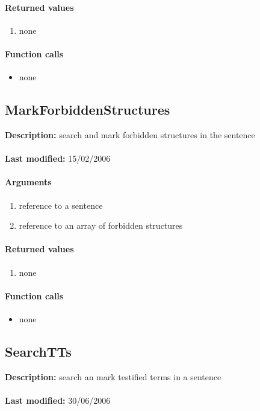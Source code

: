 \paragraph{Returned values}
\begin{enumerate}
\item none
\end{enumerate}

\paragraph{Function calls}
\begin{itemize}
\item none
\end{itemize}

\subsection{MarkForbiddenStructures}
\textbf{Description:} search and mark forbidden structures in the sentence\\
\\\textbf{Last modified:} 15/02/2006

\paragraph{Arguments}
\begin{enumerate}
\item reference to a sentence
\item reference to an array of forbidden structures
\end{enumerate}

\paragraph{Returned values}
\begin{enumerate}
\item none
\end{enumerate}

\paragraph{Function calls}
\begin{itemize}
\item none
\end{itemize}

\subsection{SearchTTs}
\textbf{Description:} search an mark testified terms in a sentence\\
\\\textbf{Last modified:} 30/06/2006

